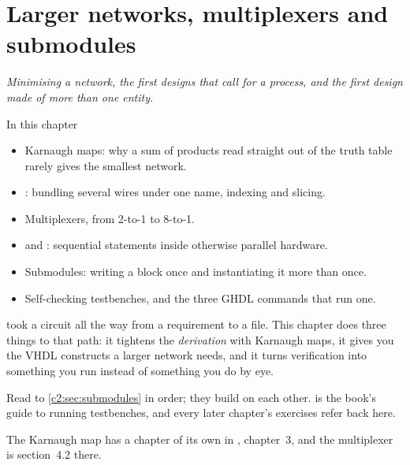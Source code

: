 
\chapter{Larger networks, multiplexers and submodules}
\label{c2:ch}

{\large\itshape Minimising a network, the first designs that call for a process, and the first
design made of more than one entity.\par}

\begin{chapterbox}{In this chapter}
\begin{itemize}
  \item Karnaugh maps: why a sum of products read straight out of the truth table rarely gives the
    smallest network.
  \item {}: bundling several wires under one name, indexing and slicing.
  \item Multiplexers, from 2-to-1 to 8-to-1.
  \item {} and : sequential statements inside otherwise parallel hardware.
  \item Submodules: writing a block once and instantiating it more than once.
  \item Self-checking testbenches, and the three GHDL commands that run one.
\end{itemize}
\end{chapterbox}

 took a circuit all the way from a requirement to a file. This chapter does three
things to that path: it tightens the \emph{derivation} with Karnaugh maps, it gives you the VHDL
constructs a larger network needs, and it turns verification into something you run instead of
something you do by eye.

Read  to \ref{c2:sec:submodules} in order; they build on each other.
 is the book's guide to running testbenches, and every later chapter's
exercises refer back here.

\note[Refresher] The Karnaugh map has a chapter of its own in \debook{}, chapter~3, and the
multiplexer is section~4.2 there.





